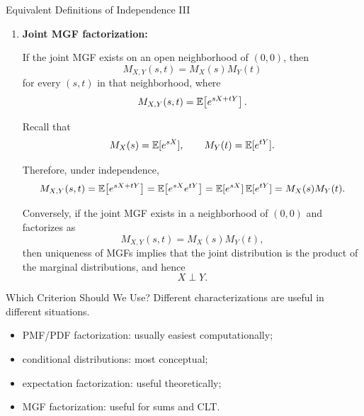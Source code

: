 \begin{frame}{Equivalent Definitions of Independence III}

\begin{enumerate}

\item[\textbf{6.}] \textbf{Joint MGF factorization:}

If the joint MGF exists on an open neighborhood of $(0,0)$, then
$$
M_{X,Y}(s,t)
=
M_X(s)M_Y(t)
$$
for every $(s,t)$ in that neighborhood, where
$$
M_{X,Y}(s,t)
=
\mathbb{E}\!\left[e^{sX+tY}\right].
$$

Recall that
$$
M_X(s)=\mathbb{E}[e^{sX}],
\qquad
M_Y(t)=\mathbb{E}[e^{tY}].
$$

Therefore, under independence,
$$
M_{X,Y}(s,t)=\mathbb{E}\!\left[e^{sX+tY}\right]=\mathbb{E}\!\left[e^{sX}e^{tY}\right]=\mathbb{E}[e^{sX}]\,\mathbb{E}[e^{tY}]=M_X(s)M_Y(t).
$$

Conversely, if the joint MGF exists in a neighborhood of $(0,0)$ and
factorizes as
$$
M_{X,Y}(s,t)=M_X(s)M_Y(t),
$$
then uniqueness of MGFs implies that the joint distribution is the
product of the marginal distributions, and hence
$$
X\perp Y.
$$

\end{enumerate}

\end{frame}


















\begin{frame}{Which Criterion Should We Use?}
Different characterizations are useful in different situations.

\vspace{0.25cm}

\begin{itemize}
    \item PMF/PDF factorization:
    usually easiest computationally;

    \item conditional distributions:
    most conceptual;

    \item expectation factorization:
    useful theoretically;

    \item MGF factorization:
    useful for sums and CLT.
\end{itemize}
\end{frame}

